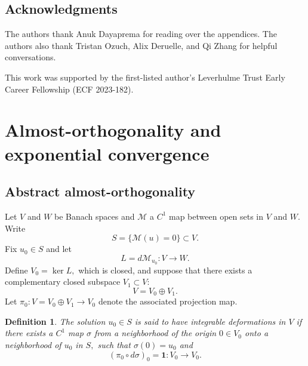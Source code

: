 \documentclass[12pt]{amsart}
\newcommand{\calM}{\mathcal{M}}
\renewcommand{\1}{{\mathbf 1}}
\theoremstyle{others}
\newtheorem{defn}[thm]{Definition}
\numberwithin{equation}{section}
\begin{document}
\subsection{Acknowledgments} The authors thank Anuk Dayaprema for reading over the appendices.
The authors also thank Tristan Ozuch, Alix Deruelle, and Qi Zhang for helpful conversations.

This work was supported by the first-listed author's Leverhulme Trust Early Career Fellowship (ECF 2023-182).


\vspace{10mm}




\section{Almost-orthogonality and exponential convergence%
} \label{sec: almost-orthogonality and exponential convergence}


\subsection{Abstract almost-orthogonality}

Let $V$ and $W$ be Banach spaces and $\calM$ a $C^1$ map between open sets in $V$ and $W.$ Write
$$S = \{ \calM(u) = 0 \} \subset V.$$
Fix $u_0 \in S$ and let
$$L = d\calM_{u_0}: V \to W.$$ %
Define $V_0 = \ker L,$ which is closed, and suppose that there exists a %
complementary closed subspace $V_1 \subset V:$ 
$$V = V_0 \oplus V_1.$$
Let $\pi_0 : V= V_0 \oplus V_1 \to V_0$ denote the associated projection map.

\begin{defn}
The solution %
$u_0 \in S$ is said to have \emph{integrable deformations} in $V$ if there exists a $C^1$ map $\sigma$ from a neighborhood of the origin $0 \in V_0$ onto a neighborhood of $u_0$ in $S,$ such that $\sigma(0) = u_0$ and
$$ \left( \pi_0 \circ d\sigma \right)_{0} = \mathbf{1} : V_0 \to V_0.$$
\end{defn}
\end{document}
